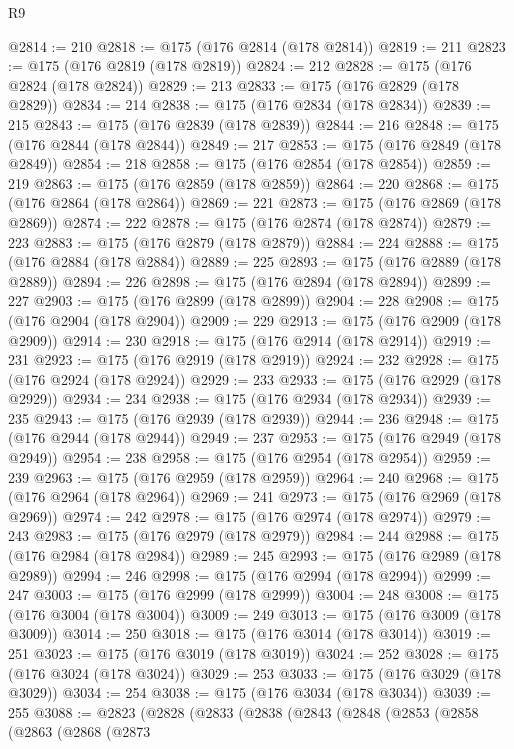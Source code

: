 \begin{lexlean}{R9}
\begin{coremodule}
@2814 := 210
@2818 := @175 (@176 @2814 (@178 @2814))
@2819 := 211
@2823 := @175 (@176 @2819 (@178 @2819))
@2824 := 212
@2828 := @175 (@176 @2824 (@178 @2824))
@2829 := 213
@2833 := @175 (@176 @2829 (@178 @2829))
@2834 := 214
@2838 := @175 (@176 @2834 (@178 @2834))
@2839 := 215
@2843 := @175 (@176 @2839 (@178 @2839))
@2844 := 216
@2848 := @175 (@176 @2844 (@178 @2844))
@2849 := 217
@2853 := @175 (@176 @2849 (@178 @2849))
@2854 := 218
@2858 := @175 (@176 @2854 (@178 @2854))
@2859 := 219
@2863 := @175 (@176 @2859 (@178 @2859))
@2864 := 220
@2868 := @175 (@176 @2864 (@178 @2864))
@2869 := 221
@2873 := @175 (@176 @2869 (@178 @2869))
@2874 := 222
@2878 := @175 (@176 @2874 (@178 @2874))
@2879 := 223
@2883 := @175 (@176 @2879 (@178 @2879))
@2884 := 224
@2888 := @175 (@176 @2884 (@178 @2884))
@2889 := 225
@2893 := @175 (@176 @2889 (@178 @2889))
@2894 := 226
@2898 := @175 (@176 @2894 (@178 @2894))
@2899 := 227
@2903 := @175 (@176 @2899 (@178 @2899))
@2904 := 228
@2908 := @175 (@176 @2904 (@178 @2904))
@2909 := 229
@2913 := @175 (@176 @2909 (@178 @2909))
@2914 := 230
@2918 := @175 (@176 @2914 (@178 @2914))
@2919 := 231
@2923 := @175 (@176 @2919 (@178 @2919))
@2924 := 232
@2928 := @175 (@176 @2924 (@178 @2924))
@2929 := 233
@2933 := @175 (@176 @2929 (@178 @2929))
@2934 := 234
@2938 := @175 (@176 @2934 (@178 @2934))
@2939 := 235
@2943 := @175 (@176 @2939 (@178 @2939))
@2944 := 236
@2948 := @175 (@176 @2944 (@178 @2944))
@2949 := 237
@2953 := @175 (@176 @2949 (@178 @2949))
@2954 := 238
@2958 := @175 (@176 @2954 (@178 @2954))
@2959 := 239
@2963 := @175 (@176 @2959 (@178 @2959))
@2964 := 240
@2968 := @175 (@176 @2964 (@178 @2964))
@2969 := 241
@2973 := @175 (@176 @2969 (@178 @2969))
@2974 := 242
@2978 := @175 (@176 @2974 (@178 @2974))
@2979 := 243
@2983 := @175 (@176 @2979 (@178 @2979))
@2984 := 244
@2988 := @175 (@176 @2984 (@178 @2984))
@2989 := 245
@2993 := @175 (@176 @2989 (@178 @2989))
@2994 := 246
@2998 := @175 (@176 @2994 (@178 @2994))
@2999 := 247
@3003 := @175 (@176 @2999 (@178 @2999))
@3004 := 248
@3008 := @175 (@176 @3004 (@178 @3004))
@3009 := 249
@3013 := @175 (@176 @3009 (@178 @3009))
@3014 := 250
@3018 := @175 (@176 @3014 (@178 @3014))
@3019 := 251
@3023 := @175 (@176 @3019 (@178 @3019))
@3024 := 252
@3028 := @175 (@176 @3024 (@178 @3024))
@3029 := 253
@3033 := @175 (@176 @3029 (@178 @3029))
@3034 := 254
@3038 := @175 (@176 @3034 (@178 @3034))
@3039 := 255
@3088 := @2823
    (@2828
      (@2833
        (@2838
          (@2843
            (@2848
              (@2853
                (@2858
                  (@2863
                    (@2868
                      (@2873

\end{coremodule}
\end{lexlean}
